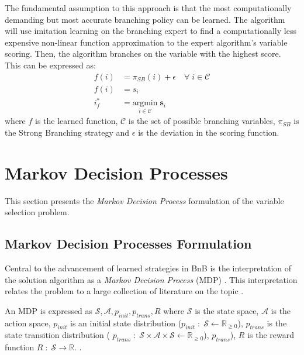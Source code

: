 The fundamental assumption to this approach is that the most computationally demanding but most accurate branching policy can be learned. The algorithm will use imitation learning on the branching expert to find a computationally less expensive non-linear function approximation to the expert algorithm's variable scoring. Then, the algorithm branches on the variable with the highest score. This can be expressed as: 
\begin{align}
    f(i) &=  \pi_{SB} (i) + \epsilon \quad \forall \; i \in \mathcal{C}\\
    f(i) &= s_i\\
    i^*_f &= \underset{i \in \mathcal{C}}{\mathrm{argmin}} \; \bm{s}_i
\end{align}
where $f$ is the learned function, $\mathcal{C}$ is the set of possible branching variables, $\pi_{SB}$ is the Strong Branching strategy and $\epsilon$ is the deviation in the scoring function. 




\section{Markov Decision Processes}\label{sec:mdp}

This section presents the \textit{Markov Decision Process} formulation of the variable selection problem. 


\subsection{Markov Decision Processes Formulation}\label{ssec:mdp}

Central to the advancement of learned strategies in \gls{BnB} is the interpretation of the solution algorithm as a \textit{Markov Decision Process} (\gls{MDP}) \cite{gasse2019exact}. This interpretation relates the problem to a large collection of literature on the topic \cite{howard1960dynamic}.

An \gls{MDP} is expressed as $ \mathcal{S}, \mathcal{A}, p_{init}, p_{trans}, R$ 
where $ \mathcal{S}$ is the state space, 
$\mathcal{A}$ is the action space, 
$p_{init}$ is an initial state distribution ($p_{init}\;:\;\mathcal{S}\leftarrow \mathbb{R}_{\geq 0}$), 
$p_{trans}$ is the state transition distribution (
$p_{trans}\; : \; \mathcal{S}
\times \mathcal{A}\times \mathcal{S}
\leftarrow \mathbb{R}_{\geq 0}$), 
$p_{trans}$), $R$ is the reward function $R\;:\;\mathcal{S} \rightarrow \mathbb{R}$. \cite{prouvost2020ecole}. 

